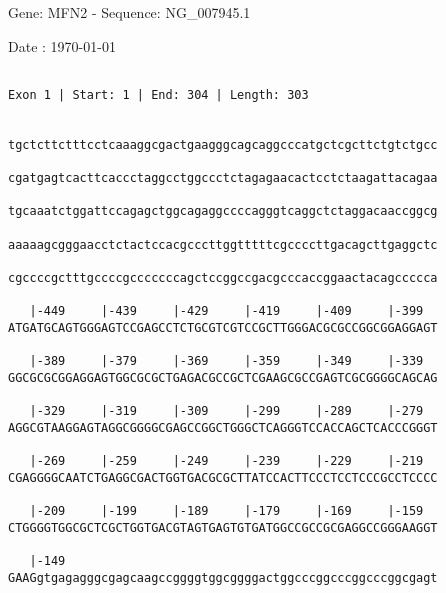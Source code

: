 \documentclass{article}
\begin{document}
\begin{center}
\begin{large}
 Gene: MFN2 - Sequence: NG\_007945.1
 
 Date : \today
\end{large}
\end{center}
 \begin{Verbatim}
 
Exon 1 | Start: 1 | End: 304 | Length: 303


tgctcttctttcctcaaaggcgactgaagggcagcaggcccatgctcgcttctgtctgcc
                                                            
cgatgagtcacttcaccctaggcctggccctctagagaacactcctctaagattacagaa
                                                            
tgcaaatctggattccagagctggcagaggccccagggtcaggctctaggacaaccggcg
                                                            
aaaaagcgggaacctctactccacgcccttggtttttcgccccttgacagcttgaggctc
                                                            
cgccccgctttgccccgcccccccagctccggccgacgcccaccggaactacagccccca
                                                            
   |-449     |-439     |-429     |-419     |-409     |-399  
ATGATGCAGTGGGAGTCCGAGCCTCTGCGTCGTCCGCTTGGGACGCGCCGGCGGAGGAGT
                                                            
   |-389     |-379     |-369     |-359     |-349     |-339  
GGCGCGCGGAGGAGTGGCGCGCTGAGACGCCGCTCGAAGCGCCGAGTCGCGGGGCAGCAG
                                                            
   |-329     |-319     |-309     |-299     |-289     |-279  
AGGCGTAAGGAGTAGGCGGGGCGAGCCGGCTGGGCTCAGGGTCCACCAGCTCACCCGGGT
                                                            
   |-269     |-259     |-249     |-239     |-229     |-219  
CGAGGGGCAATCTGAGGCGACTGGTGACGCGCTTATCCACTTCCCTCCTCCCGCCTCCCC
                                                            
   |-209     |-199     |-189     |-179     |-169     |-159  
CTGGGGTGGCGCTCGCTGGTGACGTAGTGAGTGTGATGGCCGCCGCGAGGCCGGGAAGGT
                                                            
   |-149                                                    
GAAGgtgagagggcgagcaagccggggtggcggggactggcccggcccggcccggcgagt
                                                            

\end{Verbatim}
\end{document}
